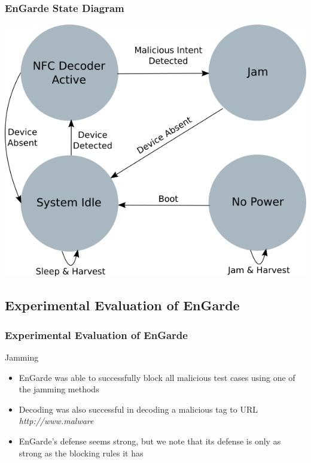 \documentclass[unknownkeysallowed]{beamer}
\begin{document}
\begin{frame}
\frametitle{EnGarde State Diagram}
\begin{center}
  \includegraphics[width=.8\linewidth,height=.7\textheight,keepaspectratio]{figures/engarde/states5.png}
\end{center}
\end{frame}

\subsection{Experimental Evaluation of EnGarde}

\begin{frame}
\frametitle{Experimental Evaluation of EnGarde}
  \begin{center}
  \begin{minipage}{.9\textwidth}
  \begin{block}{Jamming}
    \begin{itemize}
      \item{EnGarde was able to successfully block all malicious test cases using one of the jamming methods}
      \pause
      \vspace{1mm}
      \item{Decoding was also successful in decoding a malicious tag to URL \textit{http://www.malware}}
      \pause
      \vspace{1mm}
      \item{EnGarde's defense seems strong, but we note that its defense is only as strong as the blocking rules it has}
    \end{itemize}
  \end{block}
  \end{minipage}
  \end{center}
\end{frame}
\end{document}
